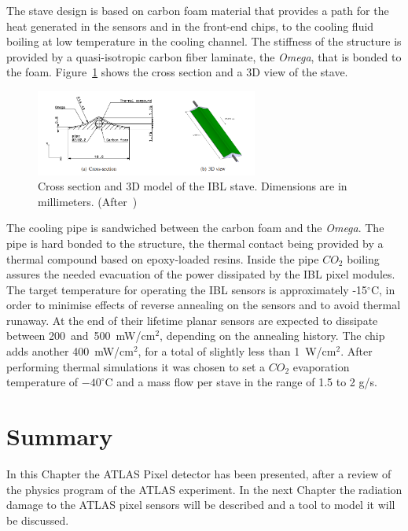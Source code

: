 The stave design is based on carbon foam material that provides a path for the heat generated in the sensors and in the front-end chips, to the cooling fluid boiling at low temperature in the cooling channel. 
The stiffness of the structure is provided by a quasi-isotropic carbon fiber laminate, the {\it Omega}, that is bonded to the foam. Figure~\ref{fig:Omega} shows the cross section and a 3D view of the stave.

\begin{figure}[!htpb]
\centering
\includegraphics[width=0.65\textwidth]{omega.png}
\caption{\label{fig:Omega}Cross section and 3D model of the IBL stave. Dimensions are in millimeters.
 (After~\cite{IBLTDR})}
\end{figure}

The cooling pipe is sandwiched between the carbon foam and the {\it Omega}. The pipe is hard bonded
to the structure, the thermal contact being provided by a thermal compound based on epoxy-loaded
resins. Inside the pipe $CO_2$ boiling assures the needed evacuation of the power dissipated 
by the IBL pixel modules. The target temperature
for operating the IBL sensors is approximately -15$^{\circ}$C, in order to minimise effects of reverse
annealing on the sensors and to avoid thermal runaway. At the end of their lifetime 
planar sensors are expected to dissipate between 200~and~500~mW/cm$^2$, depending 
on the annealing history. The chip adds another 400~mW/cm$^2$, for a total of slightly less than 
1~W/cm$^2$. After performing thermal simulations it was chosen to set a $CO_2$ evaporation 
temperature of $-40^{\circ}$C and a mass flow per stave in the range of 1.5 to 2 g/s.

\section{Summary}
In this Chapter the ATLAS Pixel detector has been presented, after a review of the physics program 
of the ATLAS experiment. In the next Chapter the radiation damage to the ATLAS pixel sensors 
will be described and a tool to model it will be discussed.

